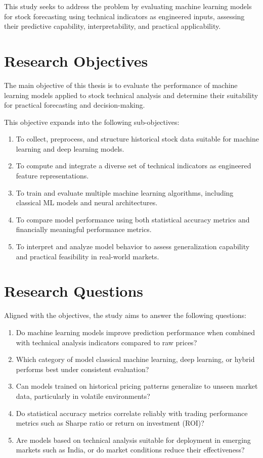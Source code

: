 This study seeks to address the problem by evaluating machine learning models for stock forecasting using technical indicators as engineered inputs, assessing their predictive capability, interpretability, and practical applicability.

\section{Research Objectives}

The main objective of this thesis is to evaluate the performance of machine learning models applied to stock technical analysis and determine their suitability for practical forecasting and decision-making.

This objective expands into the following sub-objectives:

\begin{enumerate}
    \item To collect, preprocess, and structure historical stock data suitable for machine learning and deep learning models.
    \item To compute and integrate a diverse set of technical indicators as engineered feature representations.
    \item To train and evaluate multiple machine learning algorithms, including classical ML models and neural architectures.
    \item To compare model performance using both statistical accuracy metrics and financially meaningful performance metrics.
    \item To interpret and analyze model behavior to assess generalization capability and practical feasibility in real-world markets.
\end{enumerate}

\section{Research Questions}

Aligned with the objectives, the study aims to answer the following questions:

\begin{enumerate}
    \item Do machine learning models improve prediction performance when combined with technical analysis indicators compared to raw prices?
    \item Which category of model  classical machine learning, deep learning, or hybrid  performs best under consistent evaluation?
    \item Can models trained on historical pricing patterns generalize to unseen market data, particularly in volatile environments?
    \item Do statistical accuracy metrics correlate reliably with trading performance metrics such as Sharpe ratio or return on investment (ROI)?
    \item Are models based on technical analysis suitable for deployment in emerging markets such as India, or do market conditions reduce their effectiveness?
\end{enumerate}

